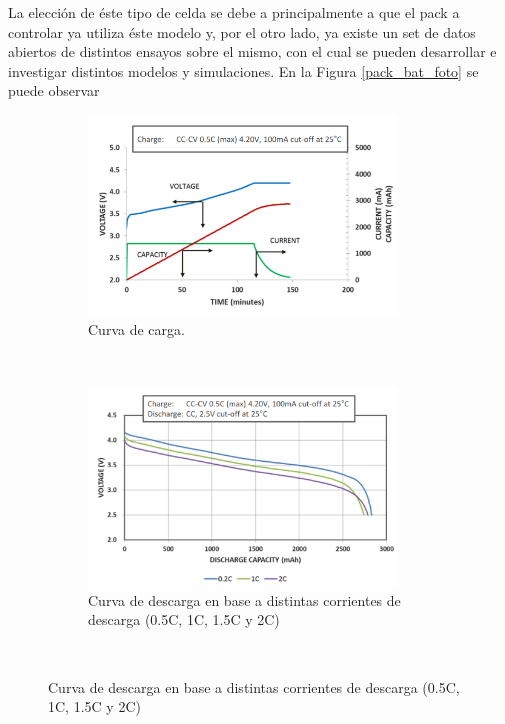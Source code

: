 \documentclass[10pt, a4paper]{article}
\begin{document}
La elecci\'on de \'este tipo de celda se debe a principalmente a que el pack a
controlar ya utiliza \'este modelo y, por el otro lado, ya existe un set de 
datos abiertos \cite{Kollmeyer2018} de distintos ensayos sobre el
mismo, con el cual se pueden desarrollar e investigar distintos modelos y 
simulaciones. En la Figura \ref{pack_bat_foto} se puede observar 

\begin{figure}[h!]
    \begin{subfigure}[t]{.5\textwidth}
	\includegraphics[width=0.9\textwidth]{cc_cv_18650.png}
	\caption{Curva de carga.}
	\label{cc_cv_18650}
    \end{subfigure}%
    ~ 
    \begin{subfigure}[t]{.5\textwidth}
	\includegraphics[width=0.9\textwidth]{discharge_18650.png}
	\caption{Curva de descarga en base a distintas corrientes de descarga (0.5C,
	1C, 1.5C y 2C)}
	\label{descarga_18650}
    \end{subfigure}
    ~ 
    \begin{centering}

\end{centering}
\end{figure}
\end{document}
